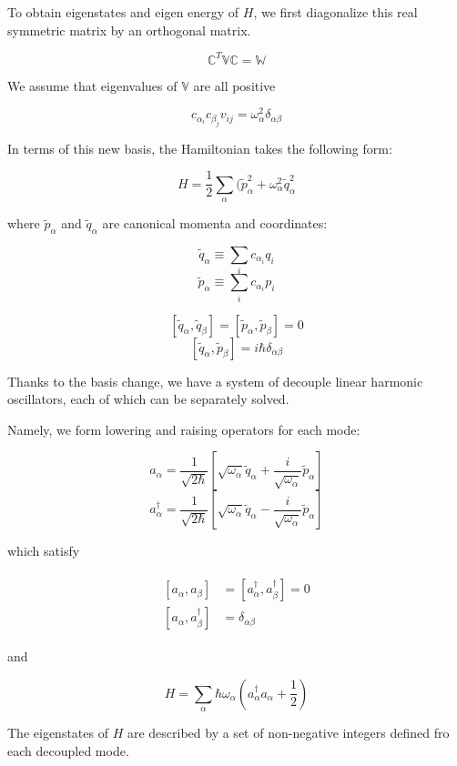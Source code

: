 To obtain eigenstates and eigen energy of $H$, we first diagonalize this real symmetric matrix by an orthogonal matrix. 

\[\mathbb{C}^T \mathbb{V}\mathbb{C} = \mathbb{W} \]

We assume that eigenvalues of $\mathbb{V}$ are all positive

\[c_{\alpha_i}c_{\beta_j}v_{ij} = \omega_{\alpha}^2\delta_{\alpha\beta} \]

In terms of this new basis, the Hamiltonian takes the following form:

\[H = \frac{1}{2}\sum_{\alpha}(\tilde{p}_{\alpha}^2+\omega_{\alpha}^2\tilde{q}_{\alpha}^2 \]

where $\tilde{p}_{\alpha}$ and $\tilde{q}_{\alpha}$ are canonical momenta and coordinates:

\[\tilde{q}_{\alpha}\equiv \sum_i c_{\alpha_i}q_i \]
\[\tilde{p}_{\alpha}\equiv \sum_i c_{\alpha_i}p_i \]

\[[\tilde{q}_{\alpha},\tilde{q}_{\beta}] = [\tilde{p}_{\alpha},\tilde{p}_{\beta}] = 0 \]
\[[\tilde{q}_{\alpha},\tilde{p}_{\beta}] = i\hbar\delta_{\alpha\beta} \]

Thanks to the basis change, we have a system of decouple linear harmonic oscillators, each of which can be separately solved. 

Namely, we form lowering and raising operators for each mode:

\[a_{\alpha} = \frac{1}{\sqrt{2\hbar}}\left[\sqrt{\omega_{\alpha}}\tilde{q}_{\alpha}+\frac{i}{\sqrt{\omega_{\alpha}}}\tilde{p}_{\alpha}\right] \]
\[a_{\alpha}^\dagger = \frac{1}{\sqrt{2\hbar}}\left[\sqrt{\omega_{\alpha}}\tilde{q}_{\alpha}-\frac{i}{\sqrt{\omega_{\alpha}}}\tilde{p}_{\alpha}\right] \]

which satisfy

\begin{align}\label{Eqs1.3.2}
\begin{split}
[a_{\alpha},a_{\beta}] & = [a_\alpha^\dagger, a_\beta^\dagger] = 0\\
[a_\alpha,a_\beta^\dagger] &= \delta_{\alpha\beta}
\end{split}
\end{align}

and

\[H = \sum_\alpha \hbar\omega_\alpha(a^\dagger_\alpha a_\alpha + \frac{1}{2}) \]

The eigenstates of $H$ are described by a set of non-negative integers defined fro each decoupled mode. 

